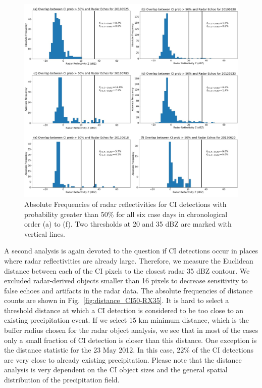 \begin{figure}
\centering
\includegraphics[width=\textwidth]{Grafiken/Abbildungen/overlap_CI50_RX.jpg}
\caption{Absolute Frequencies of radar reflectivities for CI detections with probability greater than 50\% for all six case days in chronological order (a) to (f). Two thresholds at 20 and 35 dBZ are marked with vertical lines.}
\label{fig:overlap_CI50-RX}
\end{figure}

A second analysis is again devoted to the question if CI detections occur in places where radar reflectivities are already large. Therefore, we measure the Euclidean distance between each of the CI pixels to the closest radar 35 dBZ contour. We excluded radar-derived objects smaller than 16 pixels to decrease sensitivity to false echoes and artifacts in the radar data. The absolute frequencies of distance counts are shown in Fig.~\ref{fig:distance_CI50-RX35}. It is hard to select a threshold distance at which a CI detection is considered to be too close to an existing precipitation event. If we select 15 km minimum distance, which is the buffer radius chosen for the radar object analysis, we see that in most of the cases only a small fraction of CI detection is closer than this distance. One exception is the distance statistic for the 23 May 2012. In this case, 22\% of the CI detections are very close to already existing precipitation. Please note that the distance analysis is very dependent on the CI object sizes and the general spatial distribution of the precipitation field.


